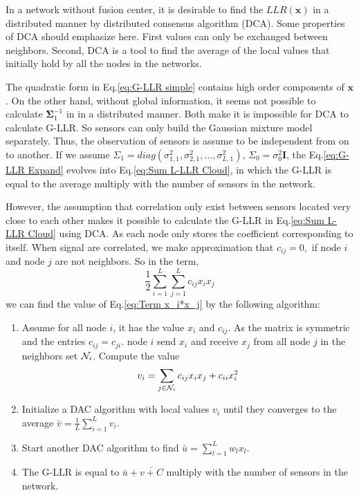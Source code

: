 In a network without fusion center, it is desirable to find the $LLR(\mathbf{x})$
in a distributed manner by distributed consensus algorithm (DCA).
Some properties of DCA should emphasize here. First values can only
be exchanged between neighbors. Second, DCA is a tool to find the
average of the local values that initially hold by all the nodes in
the networks. 

The quadratic form in Eq.\ref{eq:G-LLR simple} contains high order
components of $\mathbf{x}$. On the other hand, without global information,
it seems not possible to calculate $\mathbf{\Sigma}_{1}^{-1}$ in
in a distributed manner. Both make it is impossible for DCA to calculate
G-LLR. So sensors can only build the Gaussian mixture model separately.
Thus, the observation of sensors is assume to be independent from
on to another. If we assume $\Sigma_{1}=diag\left(\sigma_{1,1}^{2},\sigma_{2,1}^{2},\ldots,\sigma_{L,1}^{2}\right)$,
$\Sigma_{0}=\sigma_{0}^{2}\mathbf{I}$, the Eq.\ref{eq:G-LLR Expand}
evolves into Eq.\ref{eq:Sum L-LLR Cloud}, in which the G-LLR is equal
to the average multiply with the number of sensors in the network. 

However, the assumption that correlation only exist between sensors
located very close to each other makes it possible to calculate the
G-LLR in Eq.\ref{eq:Sum L-LLR Cloud} using DCA. As each node only
stores the coefficient corresponding to itself. When signal are correlated,
we make approximation that $c_{ij}=0,$ if node $i$ and node $j$
are not neighbors. So in the term, 
\begin{equation}
\frac{1}{2}\sum_{i=1}^{L}\sum_{j=1}^{L}c_{ij}x_{i}x_{j}\label{eq:Term x_i*x_j}
\end{equation}
we can find the value of Eq.\ref{eq:Term x_i*x_j} by the following
algorithm:
\begin{enumerate}
\item Assume for all node $i$, it has the value $x_{i}$ and $c_{ij}$.
As the matrix is symmetric and the entries $c_{ij}=c_{ji}$. node
$i$ send $x_{i}$ and receive $x_{j}$ from all node $j$ in the
neighbors set ${\cal N}_{i}$. Compute the value 
\begin{equation}
v_{i}=\sum_{j\in{\cal N}_{i}}c_{ij}x_{i}x_{j}+c_{ii}x_{i}^{2}
\end{equation}

\item Initialize a DAC algorithm with local values $v_{i}$ until they converges
to the average $\bar{v}=\frac{1}{L}\sum_{i=1}^{L}v_{i}$. 
\item Start another DAC algorithm to find $\bar{u}=\sum_{l=1}^{L}w_{l}x_{l}$. 
\item The G-LLR is equal to $\bar{u}+\bar{v+C}$ multiply with the number
of sensors in the network.
\end{enumerate}

